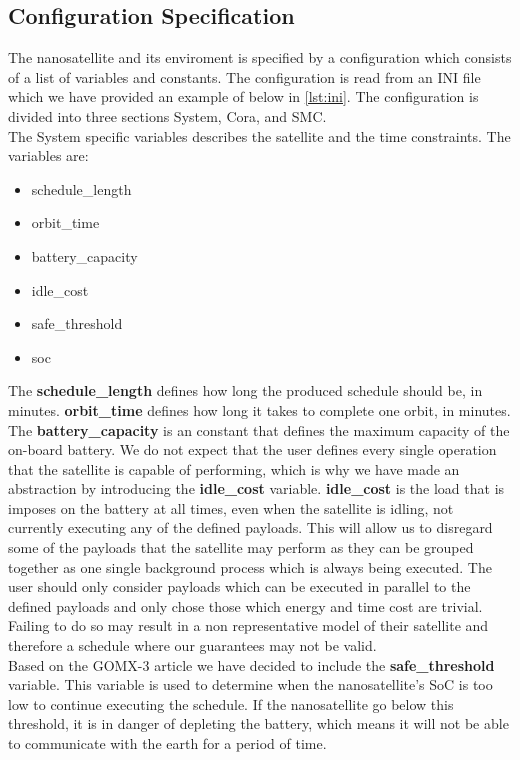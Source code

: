 \subsection{Configuration Specification} \label{subsec:init}
The nanosatellite and its enviroment is specified by a configuration which consists of a list of variables and constants. The configuration is read from an INI file which we have provided an example of below in \cref{lst:ini}.
The configuration is divided into three sections System, Cora, and SMC.\\
The System specific variables describes the satellite and the time constraints.
The variables are:
\begin{itemize}
	\item schedule\_length
	\item orbit\_time
	\item battery\_capacity
	\item idle\_cost
	\item safe\_threshold
	\item soc
\end{itemize}
The \textbf{schedule\_length} defines how long the produced schedule should be, in minutes. \textbf{orbit\_time} defines how long it takes to complete one orbit, in minutes. The \textbf{battery\_capacity} is an constant that defines the maximum capacity of the on-board battery. We do not expect that the user defines every single operation that the satellite is capable of performing, which is why we have made an abstraction by introducing the \textbf{idle\_cost} variable. 
\textbf{idle\_cost} is the load that is imposes on the battery at all times, even when the satellite is idling, not currently executing any of the defined payloads.
This will allow us to disregard some of the payloads that the satellite may perform as they can be grouped together as one single background process which is always being executed.
The user should only consider payloads which can be executed in parallel to the defined payloads and only chose those which energy and time cost are trivial.
Failing to do so may result in a non representative model of their satellite and therefore a schedule where our guarantees may not be valid.\\
Based on the GOMX-3 article\cite{gomx3} we have decided to include the \textbf{safe\_threshold} variable.
This variable is used to determine when the nanosatellite's SoC is too low to continue executing the schedule.
If the nanosatellite go below this threshold, it is in danger of depleting the battery, which means it will not be able to communicate with the earth for a period of time.
